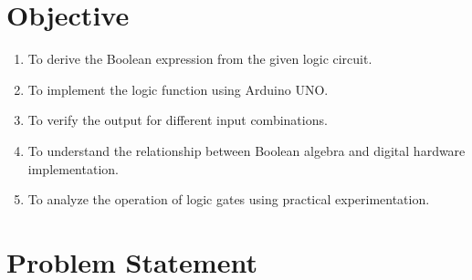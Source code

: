 \documentclass[12pt,a4paper]{article}
\begin{document}
\section{Objective}


\begin{enumerate}
  \item To derive the Boolean expression from the given logic circuit.
 \item To implement the logic function using Arduino UNO.
 \item To verify the output for different input combinations.
\item To understand the relationship between Boolean algebra and digital hardware implementation.
\item To analyze the operation of logic gates using practical experimentation.
\end{enumerate}

\section{Problem Statement}
\end{document}
